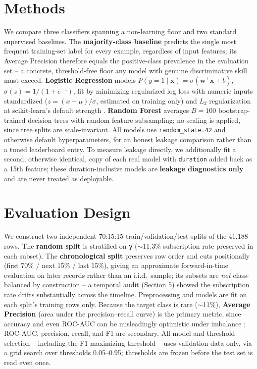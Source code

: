 \documentclass{article}
\begin{document}
\section{Methods}
We compare three classifiers spanning a non-learning floor and two standard
supervised baselines. The \textbf{majority-class baseline} predicts the
single most frequent training-set label for every example, regardless of
input features; its Average Precision therefore equals the positive-class
prevalence in the evaluation set -- a concrete, threshold-free floor any
model with genuine discriminative skill must exceed. \textbf{Logistic
Regression} models $P(y=1 \mid \mathbf{x}) = \sigma(\mathbf{w}^\top
\mathbf{x} + b)$, $\sigma(z) = 1/(1+e^{-z})$, fit by minimizing regularized
log loss with numeric inputs standardized ($z=(x-\mu)/\sigma$, estimated on
training only) and $L_2$ regularization at scikit-learn's default strength
\citep{pedregosa2011scikit}. \textbf{Random Forest} \citep{breiman2001random}
averages $B=100$ bootstrap-trained decision trees with random feature
subsampling; no scaling is applied, since tree splits are scale-invariant.
All models use \texttt{random\_state=42} and otherwise default
hyperparameters, for an honest leakage comparison rather than a tuned
leaderboard entry. To measure leakage directly, we additionally fit
a second, otherwise identical, copy of each real model with \texttt{duration}
added back as a 15th feature; these duration-inclusive models are
\textbf{leakage diagnostics only} and are never treated as deployable.

\section{Evaluation Design}
We construct two independent 70:15:15 train/validation/test splits of the
41{,}188 rows. The \textbf{random split} is stratified on \texttt{y}
($\sim$11.3\% subscription rate preserved in each subset). The
\textbf{chronological split} preserves row order and cuts positionally
(first 70\% / next 15\% / last 15\%), giving an approximate forward-in-time
evaluation on later records rather than an i.i.d.\ sample; its subsets are
\emph{not} class-balanced by construction -- a temporal audit (Section 5)
showed the subscription rate drifts substantially across the timeline.
Preprocessing and models are fit on each split's training rows only. Because
the target class is rare ($\sim$11\%), \textbf{Average Precision} (area
under the precision--recall curve) is the primary metric, since accuracy and
even ROC-AUC can be misleadingly optimistic under imbalance
\citep{saito2015precision}; ROC-AUC, precision, recall, and F1 are secondary.
All model and threshold selection -- including the F1-maximizing threshold
-- uses validation data only, via a grid search over thresholds 0.05--0.95;
thresholds are frozen before the test set is read even once.
\end{document}
